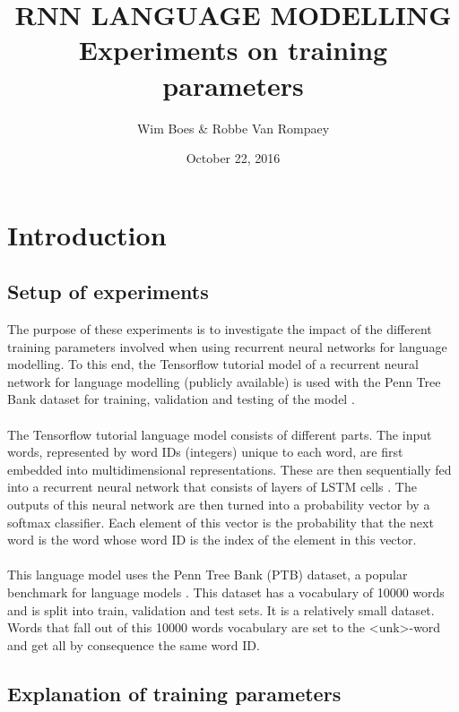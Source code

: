 \documentclass[10pt,a4paper,titlepage]{article}
\author{Wim Boes \& Robbe Van Rompaey}
\title{RNN LANGUAGE MODELLING\\Experiments on training parameters}
\date{October 22, 2016}
\begin{document}
\maketitle	

\setcounter{tocdepth}{2}
\tableofcontents

\newpage

\section{Introduction}

\subsection{Setup of experiments}
\label{sec:setup}

The purpose of these experiments is to investigate the impact of the different training parameters involved when using recurrent neural networks for language modelling. To this end, the Tensorflow tutorial model of a recurrent neural network for language modelling (publicly available) is used with the Penn Tree Bank dataset for training, validation and testing of the model \cite{tensorflow}.\\
\\
The Tensorflow tutorial language model consists of different parts. The input words, represented by word IDs (integers) unique to each word, are first embedded into multidimensional representations. These are then sequentially fed into a recurrent neural network that consists of layers of LSTM cells \cite{LSTM}. The outputs of this neural network are then turned into a probability vector by a softmax classifier. Each element of this vector is the probability that the next word is the word whose word ID is the index of the element in this vector.\\
\\
This language model uses the Penn Tree Bank (PTB) dataset, a popular benchmark for language models \cite{PTB}. This dataset has a vocabulary of 10000 words and is split into train, validation and test sets. It is a relatively small dataset. Words that fall out of this 10000 words vocabulary are set to the <unk>-word and get all by consequence the same word ID.

\subsection{Explanation of training parameters}
\label{subsec:exp}
\end{document}
